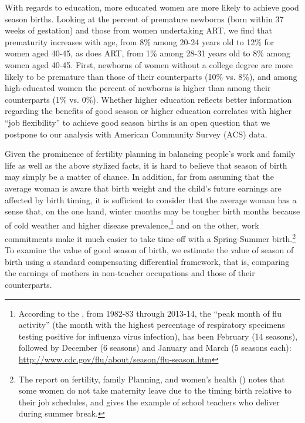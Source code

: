 \documentclass[a4paper, 11.5 pt]{article}
\theoremstyle{plain}
\begin{document}
\begin{doublespace}
With regards to education, more educated women are more likely to achieve good season births. Looking at the percent of premature newborns (born within 37 weeks of gestation) and those from women undertaking ART, we find that prematurity increases with age, from 8\% among 20-24 years old to 12\% for women aged 40-45, as does ART, from 1\% among 28-31 years old to 8\% among women aged 40-45. First, newborns of women without a college degree are more likely to be premature than those of their counterparts (10\% vs. 8\%), and among high-educated women the percent of newborns is higher than among their counterparts (1\% vs. 0\%). Whether higher education reflects better information regarding the benefits of good season or higher education correlates with higher ``job flexibility'' to achieve good season births is an open question that we postpone to our analysis with American Community Survey (ACS) data.

Given the prominence of fertility planning in balancing people's work and family life as well as the above stylized facts, it is hard to believe that season of birth may simply be a matter of chance. In addition, far from assuming that the average woman is aware that birth weight and the child's future earnings are affected by birth timing, it is sufficient to consider that the average woman has a sense that, on the one hand, winter months may be tougher birth months because of cold weather and higher disease prevalence,\footnote{According to the \citet{CDC2014}, from 1982-83 through 2013-14, the ``peak month of flu activity'' (the month with the highest percentage of respiratory specimens testing positive for influenza virus infection), has been February (14 seasons), followed by December (6 seasons) and January and March (5 seasons each): \href{http://www.cdc.gov/flu/about/season/flu-season.htm}{http://www.cdc.gov/flu/about/season/flu-season.htm}} and on the other, work commitments make it much easier to take time off with a Spring-Summer birth.\footnote{The report on fertility, family Planning, and women's health (\citealp{CDC1997}) notes that some women do not take maternity leave due to the timing birth relative to their job schedules, and gives the example of school teachers who deliver during summer break.}
To examine the value of good season of birth, we estimate the value of season of birth using a standard compensating differential framework, that is, comparing the earnings of mothers in non-teacher occupations and those of their counterparts.


\end{doublespace}
\end{document}
